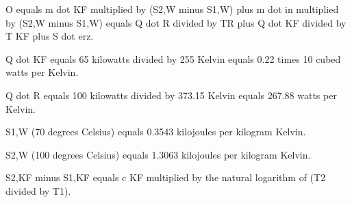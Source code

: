 O equals m dot KF multiplied by (S2,W minus S1,W) plus m dot in multiplied by (S2,W minus S1,W) equals Q dot R divided by TR plus Q dot KF divided by T KF plus S dot erz.  

Q dot KF equals 65 kilowatts divided by 255 Kelvin equals 0.22 times 10 cubed watts per Kelvin.  

Q dot R equals 100 kilowatts divided by 373.15 Kelvin equals 267.88 watts per Kelvin.  

S1,W (70 degrees Celsius) equals 0.3543 kilojoules per kilogram Kelvin.  

S2,W (100 degrees Celsius) equals 1.3063 kilojoules per kilogram Kelvin.  

S2,KF minus S1,KF equals c KF multiplied by the natural logarithm of (T2 divided by T1).